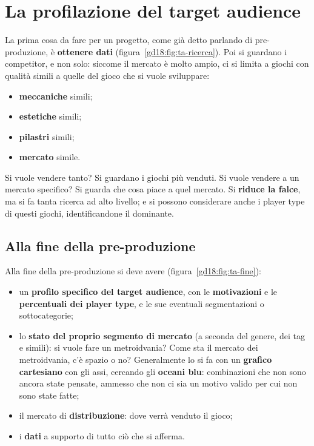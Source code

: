\section{La profilazione del target audience}
\label{gd18:sec:ta}


La prima cosa da fare per un progetto, come già detto parlando di pre-produzione, è
\textbf{ottenere dati} (figura~\ref{gd18:fig:ta-ricerca}). Poi si guardano i
competitor, e non solo: siccome il mercato è molto ampio, ci si limita a giochi con
qualità simili a quelle del gioco che si vuole sviluppare:
\begin{itemize}
  \item \textbf{meccaniche} simili;
  \item \textbf{estetiche} simili;
  \item \textbf{pilastri} simili;
  \item \textbf{mercato} simile.
\end{itemize}
Si vuole vendere tanto? Si guardano i giochi più venduti. Si vuole vendere a un
mercato specifico? Si guarda che cosa piace a quel mercato. Si \textbf{riduce la
falce}, ma si fa tanta ricerca ad alto livello; e si possono considerare anche i
player type di questi giochi, identificandone il dominante.


\subsection{Alla fine della pre-produzione}

Alla fine della pre-produzione si deve avere (figura~\ref{gd18:fig:ta-fine}):
\begin{itemize}
  \item un \textbf{profilo specifico del target audience}, con le
        \textbf{motivazioni} e le \textbf{percentuali dei player type}, e le sue
        eventuali segmentazioni o sottocategorie;
  \item lo \textbf{stato del proprio segmento di mercato} (a seconda del genere, dei
        tag e simili): si vuole fare un metroidvania? Come sta il mercato dei
        metroidvania, c'è spazio o no? Generalmente lo si fa con un
        \textbf{grafico cartesiano} con gli assi, cercando gli \textbf{oceani blu}:
        combinazioni che non sono ancora state pensate, ammesso che non ci sia un
        motivo valido per cui non sono state fatte;
  \item il mercato di \textbf{distribuzione}: dove verrà venduto il gioco;
  \item i \textbf{dati} a supporto di tutto ciò che si afferma.
\end{itemize}

